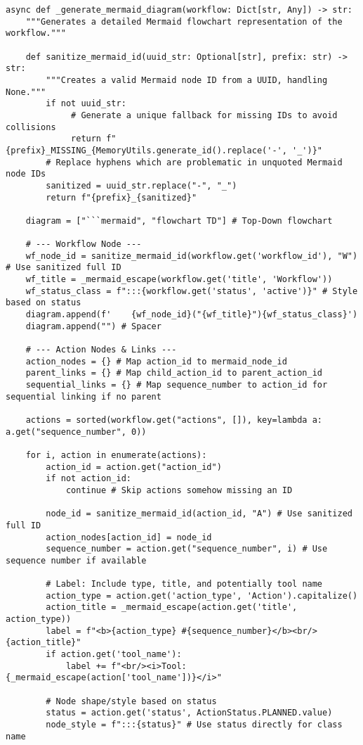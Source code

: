 \documentclass[12pt,a4paper]{article}
\begin{document}
\begin{pageablecode}
\begin{verbatim}
async def _generate_mermaid_diagram(workflow: Dict[str, Any]) -> str:
    """Generates a detailed Mermaid flowchart representation of the workflow."""

    def sanitize_mermaid_id(uuid_str: Optional[str], prefix: str) -> str:
        """Creates a valid Mermaid node ID from a UUID, handling None."""
        if not uuid_str:
             # Generate a unique fallback for missing IDs to avoid collisions
             return f"{prefix}_MISSING_{MemoryUtils.generate_id().replace('-', '_')}"
        # Replace hyphens which are problematic in unquoted Mermaid node IDs
        sanitized = uuid_str.replace("-", "_")
        return f"{prefix}_{sanitized}"

    diagram = ["```mermaid", "flowchart TD"] # Top-Down flowchart

    # --- Workflow Node ---
    wf_node_id = sanitize_mermaid_id(workflow.get('workflow_id'), "W") # Use sanitized full ID
    wf_title = _mermaid_escape(workflow.get('title', 'Workflow'))
    wf_status_class = f":::{workflow.get('status', 'active')}" # Style based on status
    diagram.append(f'    {wf_node_id}("{wf_title}"){wf_status_class}')
    diagram.append("") # Spacer

    # --- Action Nodes & Links ---
    action_nodes = {} # Map action_id to mermaid_node_id
    parent_links = {} # Map child_action_id to parent_action_id
    sequential_links = {} # Map sequence_number to action_id for sequential linking if no parent

    actions = sorted(workflow.get("actions", []), key=lambda a: a.get("sequence_number", 0))

    for i, action in enumerate(actions):
        action_id = action.get("action_id")
        if not action_id: 
            continue # Skip actions somehow missing an ID

        node_id = sanitize_mermaid_id(action_id, "A") # Use sanitized full ID
        action_nodes[action_id] = node_id
        sequence_number = action.get("sequence_number", i) # Use sequence number if available

        # Label: Include type, title, and potentially tool name
        action_type = action.get('action_type', 'Action').capitalize()
        action_title = _mermaid_escape(action.get('title', action_type))
        label = f"<b>{action_type} #{sequence_number}</b><br/>{action_title}"
        if action.get('tool_name'):
            label += f"<br/><i>Tool: {_mermaid_escape(action['tool_name'])}</i>"

        # Node shape/style based on status
        status = action.get('status', ActionStatus.PLANNED.value)
        node_style = f":::{status}" # Use status directly for class name


\end{verbatim}
\end{pageablecode}
\end{document}
